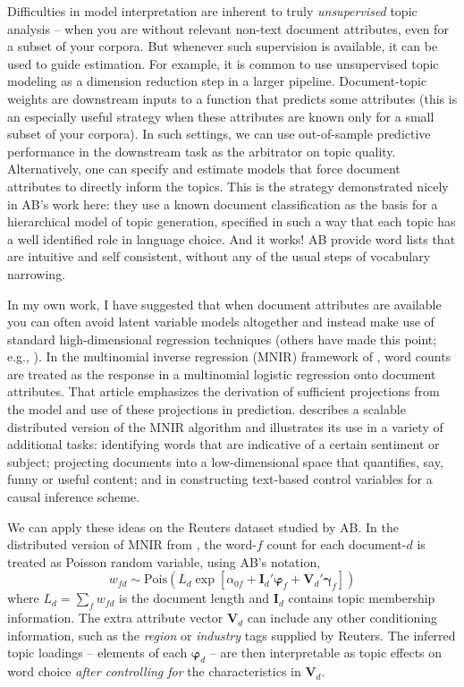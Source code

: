 \documentclass[12pt]{article}
\newcommand{\bs}[1]{\boldsymbol{#1}}
\newcommand{\mr}[1]{\mathrm{#1}}
\newcommand{\bm}[1]{\mathbf{#1}}
\begin{document}
Difficulties in model interpretation are inherent to truly {\it unsupervised}
topic analysis -- when you are without relevant non-text document attributes,
even for a subset of your corpora.  But whenever such supervision is
available, it can be used to guide estimation.  For example, it is common to
use unsupervised topic modeling as a dimension reduction step in a larger
pipeline.  Document-topic weights  are downstream inputs to a function that
predicts some  attributes (this is an especially useful strategy when
these attributes are  known only for a small subset of your corpora).  In such
settings, we can use out-of-sample predictive performance in the downstream
task as the arbitrator on topic quality.  Alternatively, one can specify and
estimate  models that force document attributes to directly inform the topics.
This is the strategy demonstrated nicely in AB's work here: they use a known
document classification as the basis for a hierarchical model of topic
generation, specified in such a way that each topic has a well identified role
in language choice.  And it works! AB provide word lists that are intuitive
and self consistent, without any of the usual steps of vocabulary narrowing.

In my own work, I have suggested that when document attributes are available you can often avoid  latent variable models altogether and instead make use of standard high-dimensional regression techniques (others have made this point; e.g., \citealt{jia2014concise}).  In the multinomial inverse regression (MNIR) framework of \cite{taddy_multinomial_2013},  word counts  are treated as the response in a multinomial logistic regression onto document attributes.  That article emphasizes the derivation of sufficient  projections from the model and use of these projections in prediction.  \cite{taddy_distributed_2015} 
describes a scalable distributed version of the MNIR algorithm and illustrates its use in a variety of additional tasks: identifying words that are indicative of a certain sentiment or subject; projecting documents into a low-dimensional space that quantifies, say, funny or useful content; and in constructing text-based control variables for a causal inference scheme.

We can apply these ideas on the Reuters dataset studied by AB.  In the
distributed version of MNIR from \cite{taddy_distributed_2015}, the word-$f$
count for each document-$d$ is treated as Poisson random variable, using AB's notation, \begin{equation}\label{eq:taddyglm} w_{fd} \sim
\mr{Pois}\left( L_d \exp\left[ \alpha_{0f} + \bm{I}_d'\bs{\varphi}_f
+ \bm{V}_d'\bs{\gamma}_f\right]\right) \end{equation} where $L_d = \sum_f
w_{fd}$ is the document length and $\bm{I}_d$ contains topic membership
information.  The extra attribute vector $\bm{V}_d$ can include any other 
conditioning information, such as the {\it region} or {\it industry}
tags supplied by Reuters.  The inferred
topic loadings -- elements of each $\bs{\varphi}_d$ -- are then interpretable
as topic effects on word choice {\it after controlling for} the characteristics in $\bm{V}_d$.  
\end{document}
